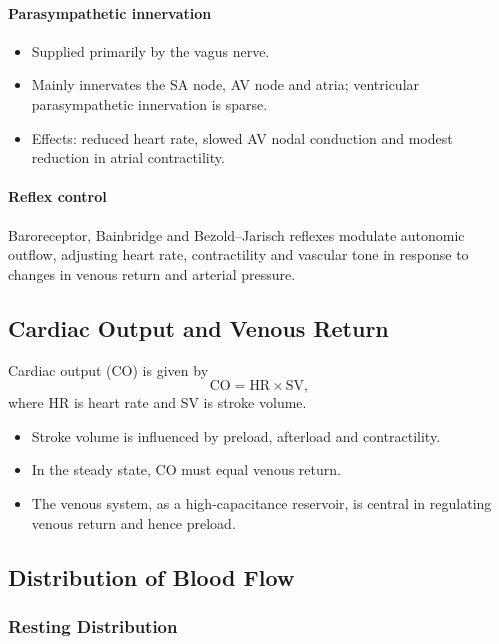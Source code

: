 \documentclass[11pt,a4paper]{article}
\begin{document}
\paragraph{Parasympathetic innervation}
\begin{itemize}
  \item Supplied primarily by the vagus nerve.
  \item Mainly innervates the SA node, AV node and atria; ventricular parasympathetic innervation is sparse.
  \item Effects: reduced heart rate, slowed AV nodal conduction and modest reduction in atrial contractility.
\end{itemize}

\paragraph{Reflex control}
Baroreceptor, Bainbridge and Bezold--Jarisch reflexes modulate autonomic outflow, adjusting heart rate, contractility and vascular tone in response to changes in venous return and arterial pressure.

\subsection{Cardiac Output and Venous Return}

Cardiac output (CO) is given by
\[
\text{CO} = \text{HR} \times \text{SV},
\]
where HR is heart rate and SV is stroke volume.

\begin{itemize}
  \item Stroke volume is influenced by preload, afterload and contractility.
  \item In the steady state, CO must equal venous return.
  \item The venous system, as a high-capacitance reservoir, is central in regulating venous return and hence preload.
\end{itemize}

\subsection{Distribution of Blood Flow}

\subsubsection{Resting Distribution}
\end{document}
